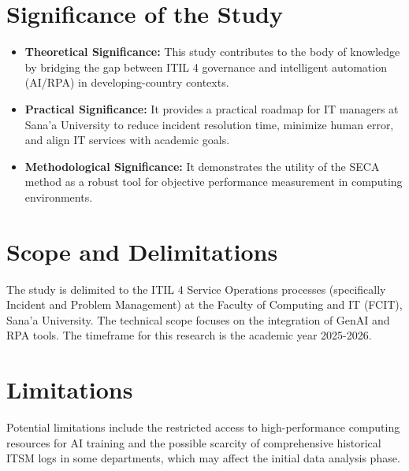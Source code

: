\documentclass[12pt,a4paper,oneside]{report}
\begin{document}
\section{Significance of the Study}
\begin{itemize}
    \item \textbf{Theoretical Significance:} This study contributes to the body of knowledge by bridging the gap between ITIL 4 governance and intelligent automation (AI/RPA) in developing-country contexts.
    \item \textbf{Practical Significance:} It provides a practical roadmap for IT managers at Sana'a University to reduce incident resolution time, minimize human error, and align IT services with academic goals.
    \item \textbf{Methodological Significance:} It demonstrates the utility of the SECA method as a robust tool for objective performance measurement in computing environments.
\end{itemize}

\section{Scope and Delimitations}
The study is delimited to the ITIL 4 Service Operations processes (specifically Incident and Problem Management) at the Faculty of Computing and IT (FCIT), Sana'a University. The technical scope focuses on the integration of GenAI and RPA tools. The timeframe for this research is the academic year 2025-2026.

\section{Limitations}
Potential limitations include the restricted access to high-performance computing resources for AI training and the possible scarcity of comprehensive historical ITSM logs in some departments, which may affect the initial data analysis phase.
\end{document}
